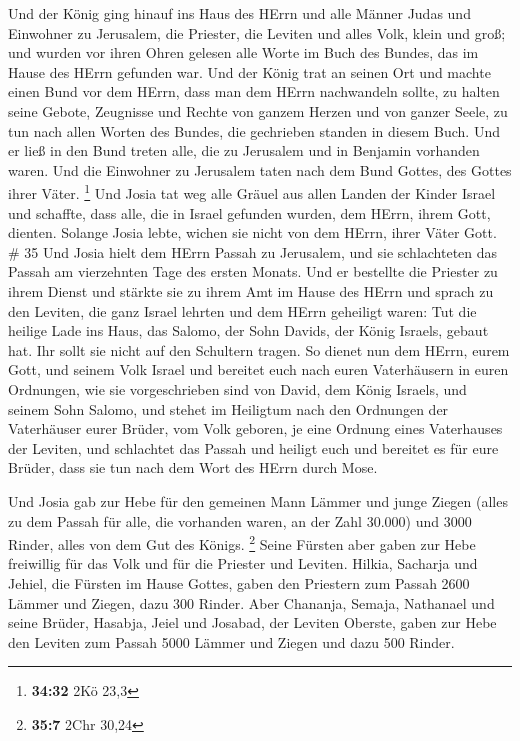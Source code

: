  Und der König ging hinauf ins Haus des HErrn und alle
Männer Judas und Einwohner zu Jerusalem, die Priester, die Leviten und
alles Volk, klein und groß; und wurden vor ihren Ohren gelesen alle
Worte im Buch des Bundes, das im Hause des HErrn gefunden war.
 Und der König trat an seinen Ort und machte einen Bund vor
dem HErrn, dass man dem HErrn nachwandeln sollte, zu halten seine
Gebote, Zeugnisse und Rechte von ganzem Herzen und von ganzer Seele, zu
tun nach allen Worten des Bundes, die gechrieben standen in diesem Buch.
 Und er ließ in den Bund treten alle, die zu Jerusalem und
in Benjamin vorhanden waren. Und die Einwohner zu Jerusalem taten nach
dem Bund Gottes, des Gottes ihrer Väter. \footnote{\textbf{34:32} 2Kö
  23,3}  Und Josia tat weg alle Gräuel aus allen Landen der
Kinder Israel und schaffte, dass alle, die in Israel gefunden wurden,
dem HErrn, ihrem Gott, dienten. Solange Josia lebte, wichen sie nicht
von dem HErrn, ihrer Väter Gott. \# 35  Und Josia hielt dem
HErrn Passah zu Jerusalem, und sie schlachteten das Passah am
vierzehnten Tage des ersten Monats.  Und er bestellte die
Priester zu ihrem Dienst und stärkte sie zu ihrem Amt im Hause des HErrn
 und sprach zu den Leviten, die ganz Israel lehrten und dem
HErrn geheiligt waren: Tut die heilige Lade ins Haus, das Salomo, der
Sohn Davids, der König Israels, gebaut hat. Ihr sollt sie nicht auf den
Schultern tragen. So dienet nun dem HErrn, eurem Gott, und seinem Volk
Israel  und bereitet euch nach euren Vaterhäusern in euren
Ordnungen, wie sie vorgeschrieben sind von David, dem König Israels, und
seinem Sohn Salomo,  und stehet im Heiligtum nach den
Ordnungen der Vaterhäuser eurer Brüder, vom Volk geboren, je eine
Ordnung eines Vaterhauses der Leviten,  und schlachtet das
Passah und heiligt euch und bereitet es für eure Brüder, dass sie tun
nach dem Wort des HErrn durch Mose.

 Und Josia gab zur Hebe für den gemeinen Mann Lämmer und
junge Ziegen (alles zu dem Passah für alle, die vorhanden waren, an der
Zahl 30.000) und 3000 Rinder, alles von dem Gut des Königs. \footnote{\textbf{35:7}
  2Chr 30,24}  Seine Fürsten aber gaben zur Hebe freiwillig
für das Volk und für die Priester und Leviten. Hilkia, Sacharja und
Jehiel, die Fürsten im Hause Gottes, gaben den Priestern zum Passah 2600
Lämmer und Ziegen, dazu 300 Rinder.  Aber Chananja, Semaja,
Nathanael und seine Brüder, Hasabja, Jeiel und Josabad, der Leviten
Oberste, gaben zur Hebe den Leviten zum Passah 5000 Lämmer und Ziegen
und dazu 500 Rinder.

